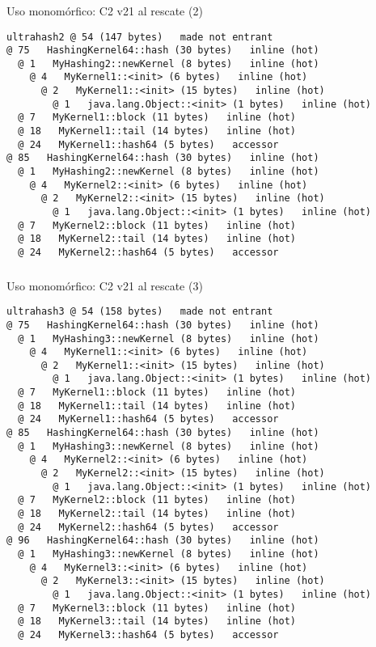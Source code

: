\begin{frame}[fragile]
  \frametitle{\ft}
  \begin{block}{Uso monomórfico: C2 v21 al rescate (2)}
    \begin{lstlisting}[basicstyle=\tiny]
ultrahash2 @ 54 (147 bytes)   made not entrant
@ 75   HashingKernel64::hash (30 bytes)   inline (hot)
  @ 1   MyHashing2::newKernel (8 bytes)   inline (hot)
    @ 4   MyKernel1::<init> (6 bytes)   inline (hot)
      @ 2   MyKernel1::<init> (15 bytes)   inline (hot)
        @ 1   java.lang.Object::<init> (1 bytes)   inline (hot)
  @ 7   MyKernel1::block (11 bytes)   inline (hot)
  @ 18   MyKernel1::tail (14 bytes)   inline (hot)
  @ 24   MyKernel1::hash64 (5 bytes)   accessor
@ 85   HashingKernel64::hash (30 bytes)   inline (hot)
  @ 1   MyHashing2::newKernel (8 bytes)   inline (hot)
    @ 4   MyKernel2::<init> (6 bytes)   inline (hot)
      @ 2   MyKernel2::<init> (15 bytes)   inline (hot)
        @ 1   java.lang.Object::<init> (1 bytes)   inline (hot)
  @ 7   MyKernel2::block (11 bytes)   inline (hot)
  @ 18   MyKernel2::tail (14 bytes)   inline (hot)
  @ 24   MyKernel2::hash64 (5 bytes)   accessor
    \end{lstlisting}
  \end{block}
\end{frame}


\begin{frame}[fragile]
  \frametitle{\ft}
  \begin{block}{Uso monomórfico: C2 v21 al rescate (3)}
    \begin{lstlisting}[basicstyle=\tiny]
ultrahash3 @ 54 (158 bytes)   made not entrant
@ 75   HashingKernel64::hash (30 bytes)   inline (hot)
  @ 1   MyHashing3::newKernel (8 bytes)   inline (hot)
    @ 4   MyKernel1::<init> (6 bytes)   inline (hot)
      @ 2   MyKernel1::<init> (15 bytes)   inline (hot)
        @ 1   java.lang.Object::<init> (1 bytes)   inline (hot)
  @ 7   MyKernel1::block (11 bytes)   inline (hot)
  @ 18   MyKernel1::tail (14 bytes)   inline (hot)
  @ 24   MyKernel1::hash64 (5 bytes)   accessor
@ 85   HashingKernel64::hash (30 bytes)   inline (hot)
  @ 1   MyHashing3::newKernel (8 bytes)   inline (hot)
    @ 4   MyKernel2::<init> (6 bytes)   inline (hot)
      @ 2   MyKernel2::<init> (15 bytes)   inline (hot)
        @ 1   java.lang.Object::<init> (1 bytes)   inline (hot)
  @ 7   MyKernel2::block (11 bytes)   inline (hot)
  @ 18   MyKernel2::tail (14 bytes)   inline (hot)
  @ 24   MyKernel2::hash64 (5 bytes)   accessor
@ 96   HashingKernel64::hash (30 bytes)   inline (hot)
  @ 1   MyHashing3::newKernel (8 bytes)   inline (hot)
    @ 4   MyKernel3::<init> (6 bytes)   inline (hot)
      @ 2   MyKernel3::<init> (15 bytes)   inline (hot)
        @ 1   java.lang.Object::<init> (1 bytes)   inline (hot)
  @ 7   MyKernel3::block (11 bytes)   inline (hot)
  @ 18   MyKernel3::tail (14 bytes)   inline (hot)
  @ 24   MyKernel3::hash64 (5 bytes)   accessor
    \end{lstlisting}
  \end{block}
\end{frame}
